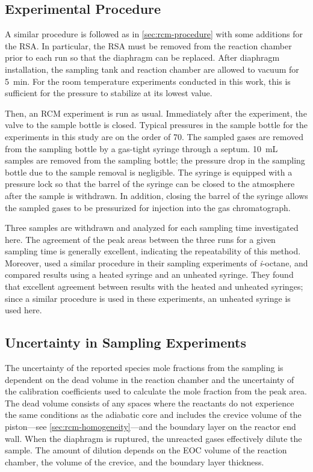 \documentclass[../main.tex]{subfiles}
\begin{document}
\subsection{Experimental Procedure}
\label{sec:rsa-procedure}

A similar procedure is followed as in \cref{sec:rcm-procedure} with some
additions for the RSA. In particular, the RSA must be removed from the
reaction chamber prior to each run so that the diaphragm can be replaced.
After diaphragm installation, the sampling tank and reaction chamber
are allowed to vacuum for \SI{5}{\minute}. For the room temperature
experiments conducted in this work, this is sufficient for the pressure
to stabilize at its lowest value.

Then, an RCM experiment is run as usual. Immediately after the experiment,
the valve to the sample bottle is closed. Typical pressures in the sample bottle for the experiments
in this study are on the order of \SI{70}{\torr}. The sampled gases are
removed from the sampling bottle by a gas-tight syringe through a septum.
\SI{10}{\milli\liter} samples are removed from the sampling bottle; the
pressure drop in the sampling bottle due to the sample removal is negligible.
The syringe is equipped with a pressure lock so that the barrel of the
syringe can be closed to the atmosphere after the sample is withdrawn.
In addition, closing the barrel of the syringe allows the sampled gases
to be pressurized for injection into the gas chromatograph.

Three samples are withdrawn and analyzed for each sampling time
investigated here. The agreement of the peak areas between the three runs
for a given sampling time is generally excellent, indicating the repeatability
of this method. Moreover, \textcite{He2007} used a similar procedure in their sampling experiments
of \textit{i}-octane, and compared results using a heated syringe and an
unheated syringe. They found that excellent agreement between results
with the heated and unheated syringes; since a similar procedure is used
in these experiments, an unheated syringe is used here.

\subsection{Uncertainty in Sampling Experiments}
\label{sec:rsa-uncertainty}

The uncertainty of the reported species mole fractions from the sampling
is dependent on the dead volume in the reaction chamber and the uncertainty
of the calibration coefficients used to calculate the mole fraction from
the peak area. The dead volume consists of any spaces where the reactants do not
experience the same conditions as the adiabatic core and includes the
crevice volume of the piston---see \cref{sec:rcm-homogeneity}---and the
boundary layer on the reactor end wall. When the diaphragm is ruptured,
the unreacted gases effectively dilute the sample. The amount of
dilution depends on the EOC volume of the reaction chamber, the volume of
the crevice, and the boundary layer thickness.
\end{document}
